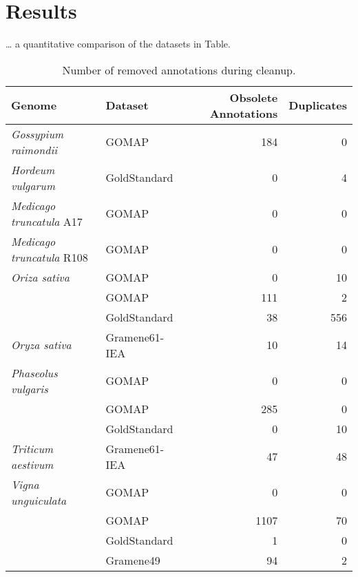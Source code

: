 \documentclass[utf8]{frontiersSCNS}
\begin{document}
\hypertarget{results}{%
\section{Results}\label{results}}

\ldots{} a quantitative comparison of the datasets in Table.

\begin{table}[t]

\caption{\label{tab:cleanup-table}Number of removed annotations during cleanup.}
\centering
\begin{tabular}{llrr}
\toprule
Genome & Dataset & Obsolete Annotations & Duplicates\\
\midrule
\rowcolor{gray!6}  \textit{Gossypium raimondii} & GOMAP & 184 & 0\\
\cmidrule{1-4}
\textit{Hordeum vulgarum} & GoldStandard & 0 & 4\\
\cmidrule{1-4}
\rowcolor{gray!6}  \textit{Medicago truncatula} A17 & GOMAP & 0 & 0\\
\cmidrule{1-4}
\textit{Medicago truncatula} R108 & GOMAP & 0 & 0\\
\cmidrule{1-4}
\rowcolor{gray!6}  \textit{Oriza sativa} & GOMAP & 0 & 10\\
\cmidrule{1-4}
 & GOMAP & 111 & 2\\

\rowcolor{gray!6}   & GoldStandard & 38 & 556\\

\multirow{-3}{*}{\raggedright\arraybackslash \textit{Oryza sativa}} & Gramene61-IEA & 10 & 14\\
\cmidrule{1-4}
\rowcolor{gray!6}  \textit{Phaseolus vulgaris} & GOMAP & 0 & 0\\
\cmidrule{1-4}
 & GOMAP & 285 & 0\\

\rowcolor{gray!6}   & GoldStandard & 0 & 10\\

\multirow{-3}{*}{\raggedright\arraybackslash \textit{Triticum aestivum}} & Gramene61-IEA & 47 & 48\\
\cmidrule{1-4}
\rowcolor{gray!6}  \textit{Vigna unguiculata} & GOMAP & 0 & 0\\
\cmidrule{1-4}
 & GOMAP & 1107 & 70\\

\rowcolor{gray!6}   & GoldStandard & 1 & 0\\

 & Gramene49 & 94 & 2\\


\end{tabular}
\end{table}
\end{document}
